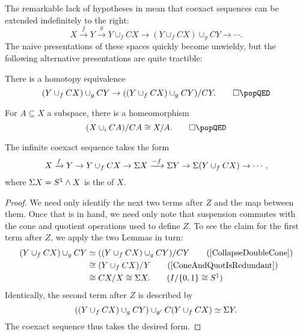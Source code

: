 The remarkable lack of hypotheses in  mean that coexact sequences can be extended indefinitely to the right: \[X \xrightarrow f Y \xrightarrow g Y \cup_f CX \to (Y \cup_f CX) \cup_g CY \to \cdots.\]
The naive presentations of these spaces quickly become unwieldy, but the following alternative presentations are quite tractible:

\begin{lemma}\label{CollapseDoubleCone}\pushQED{\qed}
There is a homotopy equivalence \[(Y \cup_f CX) \cup_g CY \to ((Y \cup_f CX) \cup_g CY) / CY. \qedhere \popQED\]
\end{lemma}

\begin{lemma}\label{ConeAndQuotIsRedundant}\pushQED{\qed}
For $A \subseteq X$ a subspace, there is a homeomorphism \[(X \cup_i CA) / CA \cong X / A. \qedhere \popQED\]
\end{lemma}

\begin{corollary}
The infinite coexact sequence takes the form \[X \xrightarrow f Y \to Y \cup_f CX \to \Sigma X \xrightarrow{-f} \Sigma Y \to \Sigma(Y \cup_f CX) \to \cdots,\] where $\Sigma X = S^1 \wedge X$ is the  of $X$.
\end{corollary}
\begin{proof}
We need only identify the next two terms after $Z$ and the map between them.
Once that is in hand, we need only note that suspension commutes with the cone and quotient operations used to define $Z$.
To see the claim for the first term after $Z$, we apply the two Lemmas in turn:
\begin{align*}
(Y \cup_f CX) \cup_g CY & \simeq ((Y \cup_f CX) \cup_g CY) / CY \tag{\Cref{CollapseDoubleCone}} \\
& \cong (Y \cup_f CX) / Y \tag{\Cref{ConeAndQuotIsRedundant}} \\
& \cong CX/X \cong \Susp X. \tag{$I / \{0, 1\} \cong S^1$}
\end{align*}
Identically, the second term after $Z$ is described by \[((Y \cup_f CX) \cup_g CY) \cup_{g'} C(Y \cup_f CX) \simeq \Sigma Y.\]
The coexact sequence thus takes the desired form.
\end{proof}

